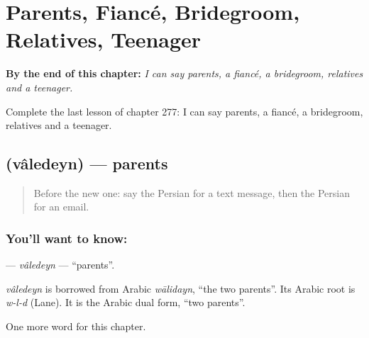 
\chapter{Parents, Fiancé, Bridegroom, Relatives, Teenager}
\label{ch:fa-parents-fiance-bridegroom-relatives-teenager}

\begin{chapteropening}
\textbf{By the end of this chapter:} \emph{I can say parents, a fiancé, a bridegroom, relatives and a teenager.}

Complete the last lesson of chapter 277: I can say parents, a fiancé, a bridegroom, relatives and a teenager.
\end{chapteropening}

\section[\texorpdfstring{\fa{والدین} (vâledeyn)}{والدین (vâledeyn)}]{ (vâledeyn) — parents}

\label{lesson:FA-C277-valedeyn}



\begin{quote}
Before the new one: say the Persian for a text message, then the Persian for an email.
\end{quote}

\subsection*{You'll want to know: }
\textbf{} — \emph{vâledeyn} — \textquotedblleft{}parents\textquotedblright{}.

\begin{cousinweb}
\emph{vâledeyn} is borrowed from Arabic \emph{wālidayn}, \textquotedblleft{}the two parents\textquotedblright{}. Its Arabic root is \emph{w-l-d} (Lane). It is the Arabic dual form, \textquotedblleft{}two parents\textquotedblright{}.
\end{cousinweb}

\begin{grammarlens}[title={What you've built}]
One more word for this chapter.
\end{grammarlens}

